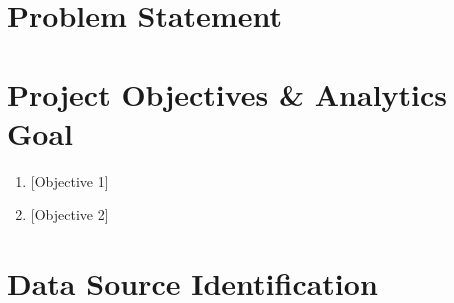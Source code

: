 \documentclass[11pt,letterpaper]{article}
\begin{document}
\maketitleblock



\section{Problem Statement}
\label{sec:problem}


\section{Project Objectives \& Analytics Goal}
\label{sec:objectives}

\begin{enumerate}
  \item {[Objective 1]}
  \item {[Objective 2]}
\end{enumerate}


\section{Data Source Identification}
\label{sec:sources}
\end{document}
